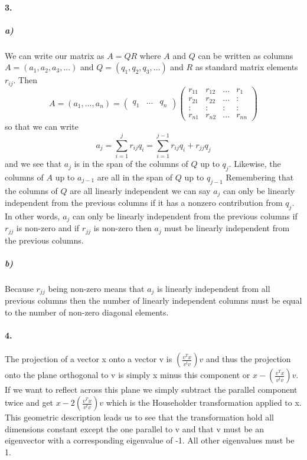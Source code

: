 \documentclass[12pt]{article}
\begin{document}
\paragraph{3.}
	\subparagraph{a)}
		We can write our matrix as $A = QR$ where $A$ and $Q$ can be written as columns $A = (a_1, a_2, a_3, ...)$ and $Q = (q_1, q_2, q_3, ...)$ and $R$ as standard matrix elements $r_{ij}$. Then 
		\[
		A = (a_1, ... , a_n) = 
		\left(\begin{matrix}
		q_1 & ... & q_n
		\end{matrix}\right)
		\left(\begin{matrix}
		r_{11} & r_{12} & ... & r_{1} \\
		r_{21} & r_{22} & ... & : \\ 
		: & : & : & :\\ 
		r_{n1} & r_{n2} & ... & r_{nn}
		\end{matrix}\right)
		\]
		so that we can write 
		\[
		a_j = \sum_{i=1}^{j}r_{ij}q_i = \sum_{i=1}^{j-1}r_{ij}q_i + r_{jj}q_j
		\]
		and we see that $a_j$ is in the span of the columns of $Q$ up to $q_j$. Likewise, the columns of $A$ up to $a_{j-1}$ are all in the span of $Q$ up to $q_{j-1}$ Remembering that the columns of $Q$ are all linearly independent we can say $a_j$ can only be linearly independent from the previous columns if it has a nonzero contribution from $q_j$. In other words, $a_j$ can only be linearly independent from the previous columns if $r_{jj}$ is non-zero and if $r_{jj}$ is non-zero then $a_j$ must be linearly independent from the previous columns.
		
	\subparagraph{b)}
		Because $r_{jj}$ being non-zero means that $a_j$ is linearly independent from all previous columns then the number of linearly independent columns must be equal to the number of non-zero diagonal elements.
		
\paragraph{4.}
	The projection of a vector x onto a vector v is $(\frac{v^Tx}{v^tv})v$ and thus the projection onto the plane orthogonal to v is simply x minus this component or $x - (\frac{v^Tx}{v^tv})v$. If we want to reflect across this plane we simply subtract the parallel component twice and get $x - 2(\frac{v^Tx}{v^tv})v$ which is the Householder transformation applied to x. This geometric description leads us to see that the transformation hold all dimensions constant except the one parallel to v and that v must be an eigenvector with a corresponding eigenvalue of -1. All other eigenvalues must be 1. 
	
\end{document}
